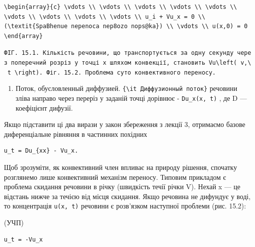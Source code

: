 \documentclass[
  ukrainian,
]{article}
\providecommand{\tightlist}{%
  \setlength{\itemsep}{0pt}\setlength{\parskip}{0pt}}
\begin{document}
\begin{verbatim}
\begin{array}{c} \vdots \\ \vdots \\ \vdots \\ \vdots \\ \vdots \\ \vdots \\ \vdots \\ \vdots \\ \vdots \\ u_i + Vu_x = 0 \\ (\textit{SpaBhenue nepenoca nep8ozo nops@ka}) \\ \vdots \\ u(x,0) = 0 \end{array}
\end{verbatim}

\texttt{ФІГ.\ 15.1.\ Кількість\ речовини,\ що\ транспортується\ за\ одну\ секунду\ через\ поперечний\ розріз\ у\ точці\ x\ шляхом\ конвекції,\ становить\ \textquotesingle{}Vu\textbackslash{}left(\ v,\textbackslash{}\ t\ \textbackslash{}right).\textquotesingle{}\ Фіг.\ 15.2.\ Проблема\ суто\ конвективного\ переносу.}

\begin{enumerate}
\def\labelenumi{\arabic{enumi}.}
\setcounter{enumi}{1}
\tightlist
\item
  Поток, обусловленный диффузией.
  \texttt{\{\textbackslash{}it\ Диффузионный\ поток\}} речовини зліва
  направо через переріз у заданій точці дорівнює - \texttt{Du\_x(x,\ t)}
  , де D --- коефіцієнт дифузії.
\end{enumerate}

Якщо підставити ці два вирази у закон збереження з лекції 3, отримаємо
базове диференціальне рівняння в частинних похідних

\begin{verbatim}
u_t = Du_{xx} - Vu_x.
\end{verbatim}

Щоб зрозуміти, як конвективний член впливає на природу рішення, спочатку
розглянемо лише конвективний механізм переносу. Типовим прикладом є
проблема скидання речовини в річку (швидкість течії річки V). Нехай x
--- це відстань нижче за течією від місця скидання. Якщо речовина не
дифундує у воді, то концентрація \texttt{u(x,\ t)} речовини є розв'язком
наступної проблеми (рис. 15.2):

(УЧП)

\begin{verbatim}
u_t = -Vu_x
\end{verbatim}
\end{document}
